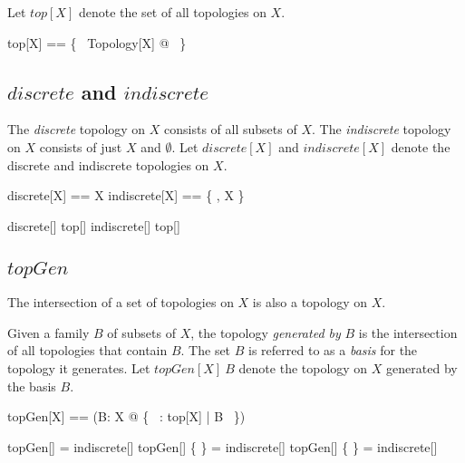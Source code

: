 \documentclass[11pt, oneside]{article}
\begin{document}
Let $top[X]$ denote the set of all topologies on $X$.

\begin{zed}
	top[X] == \{~ Topology[X] @ \tau ~\}
\end{zed}

\subsection{$discrete$ and $indiscrete$}

The {\it discrete} topology on $X$ consists of all subsets of $X$.
The {\it indiscrete} topology on $X$ consists of just $X$ and $\emptyset$.
Let $discrete[X]$ and $indiscrete[X]$ denote the discrete and indiscrete topologies on $X$.

\begin{zed}
	discrete[X] == \power X
\also
	indiscrete[X] ==  \{ \emptyset, X \}
\end{zed}

\begin{example}

\begin{zed}
	discrete[\nat] \in top[\nat] 
\also
	indiscrete[\nat] \in top[\nat]
\end{zed}

\end{example}

\subsection{$topGen$}

\begin{remark}

The intersection of a set of topologies on $X$ is also a topology on $X$.

\end{remark}

Given a family $B$ of subsets of $X$, the topology {\it generated by} $B$ is the intersection of all
topologies that contain $B$.
The set $B$ is referred to as a {\it basis} for the topology it generates.
Let $topGen[X]~B$ denote the topology on $X$ generated by the basis $B$.

\begin{zed}
	topGen[X] == (\lambda B: \family X @ \bigcap \{~ \tau: top[X] | B \subseteq \tau ~\})
\end{zed}

\begin{example}

\begin{zed}
	topGen[\nat] \emptyset = indiscrete[\nat]
\also
	topGen[\nat] \{ \emptyset \} = indiscrete[\nat]
\also
	topGen[\nat] \{ \nat \} = indiscrete[\nat]
\end{zed}

\end{example}
\end{document}
